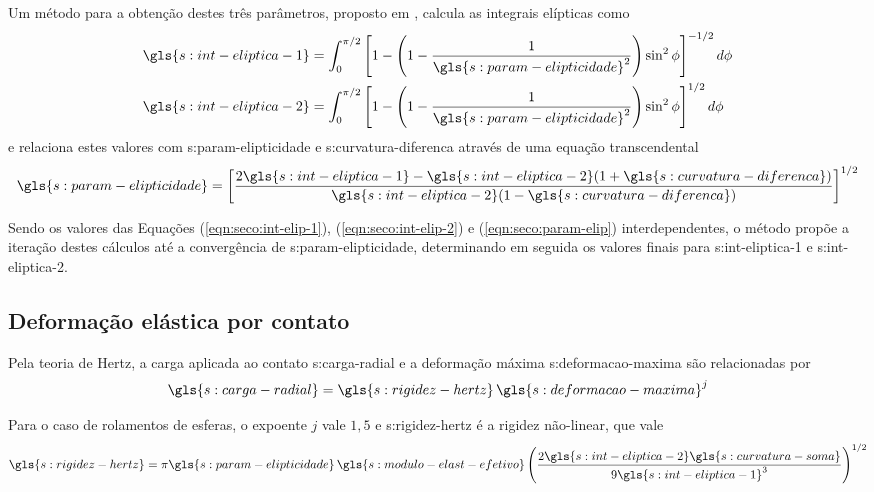 \documentclass[12pt,oneside,english,brazil,lmodern,siglas,simbolos,cite=num]{ucsmonograph}
\begin{document}
	Um método para a obtenção destes três parâmetros, proposto em \cite{hamrock:1991}, calcula as integrais elípticas como
	\begin{align}
		\gls{s:int-eliptica-1} &= \int_{0}^{\pi/2} \left[ 1 - \left( 1-\frac{1}{\gls{s:param-elipticidade}^2}\right)\sin^2\phi
		\right]^{-1/2}d\phi \label{eqn:seco:int-elip-1} \\
		\gls{s:int-eliptica-2} &= \int_{0}^{\pi/2} \left[ 1 - \left(
		1-\frac{1}{\gls{s:param-elipticidade}^2}\right)\sin^2\phi
		\right]^{1/2}d\phi \label{eqn:seco:int-elip-2}
	\end{align}
	e relaciona estes valores com \gls{s:param-elipticidade} e \gls{s:curvatura-diferenca} através de uma equação transcendental
	\begin{equation} \label{eqn:seco:param-elip}
		\gls{s:param-elipticidade} = \left[ \frac{
		2\gls{s:int-eliptica-1} - \gls{s:int-eliptica-2}(
		1+\gls{s:curvatura-diferenca})}{
		\gls{s:int-eliptica-2}(1-\gls{s:curvatura-diferenca})}
		\right]^{1/2}
	\end{equation}
	
	Sendo os valores das Equações (\ref{eqn:seco:int-elip-1}), (\ref{eqn:seco:int-elip-2}) e (\ref{eqn:seco:param-elip}) interdependentes, o método propõe a iteração destes cálculos até a convergência de \gls{s:param-elipticidade}, determinando em seguida os valores finais para \gls{s:int-eliptica-1} e \gls{s:int-eliptica-2}.
	
	\subsection{Deformação elástica por contato} \label{sec:deform-contato}
	Pela teoria de Hertz, a carga aplicada ao contato \gls{s:carga-radial} e a deformação máxima \gls{s:deformacao-maxima} são relacionadas por \cite{tandon:1997,hamrock:1991}
	\begin{equation} \label{eqn:seco:def-hertz-curta}
		\gls{s:carga-radial} = \gls{s:rigidez-hertz}\,
		\gls{s:deformacao-maxima}^j
	\end{equation}
	
	Para o caso de rolamentos de esferas, o expoente $ j $ vale $ 1,5 $ e \gls{s:rigidez-hertz} é a rigidez não-linear, que vale \cite{hamrock:1991}
	\begin{equation} \label{eqn:seco:rig-hertz}
		\gls{s:rigidez-hertz} = \pi\gls{s:param-elipticidade}\,
		\gls{s:modulo-elast-efetivo}\left( \frac{
		2\gls{s:int-eliptica-2}\gls{s:curvatura-soma}}{
		9\gls{s:int-eliptica-1}^3} \right)^{1/2}
	\end{equation}
	
\end{document}
